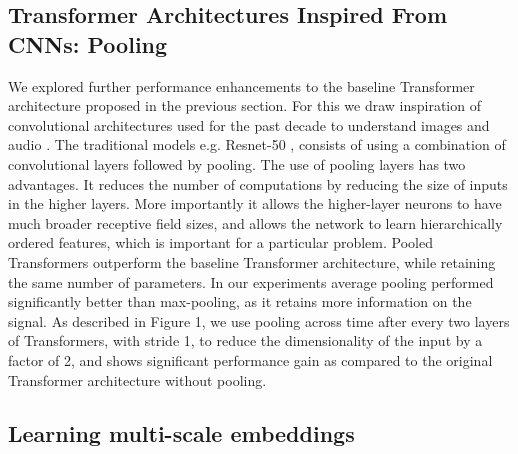 \documentclass{article}
\begin{document}
\begin{sloppy}
\subsection{Transformer Architectures Inspired From CNNs: Pooling} We explored further performance enhancements to the baseline Transformer architecture proposed in the previous section. For this we draw inspiration of convolutional architectures used for the past decade to understand images \cite{deng2009imagenet} and audio \cite{gemmeke2017audio}. The traditional models e.g. Resnet-50 \cite{he2016deep}, consists of using a combination of convolutional layers followed by pooling. The use of pooling layers has two advantages. It reduces the number of computations by reducing the size of inputs in the higher layers. More importantly it allows the higher-layer neurons to have much broader receptive field sizes, and allows the network to learn hierarchically ordered features, which is important for a particular problem. Pooled Transformers outperform the baseline Transformer architecture, while retaining the same number of parameters. In our experiments average pooling performed significantly better than max-pooling, as it retains more information on the signal. As described in Figure 1, we use pooling across time after every two layers of Transformers, with stride 1, to reduce the dimensionality of the input by a factor of 2, and shows significant performance gain as compared to the original Transformer architecture without pooling. 

\subsection{Learning multi-scale embeddings}


\end{sloppy}
\end{document}
